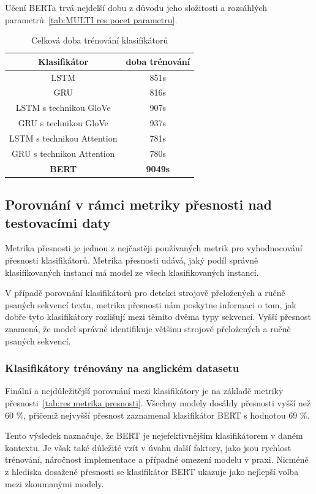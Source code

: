 Učení BERTa trvá nejdelší dobu z důvodu jeho složitosti a rozsáhlých parametrů~\ref{tab:MULTI res pocet parametru}.

\begin{table}[H]
	\centering
	\caption{Celková doba trénování klasifikátorů}\label{tab:MULTI res doba trenovani}
	\begin{tabular}{ c c }
			\toprule
			Klasifikátor & doba trénování\\
			\midrule
			LSTM & 851s\\
			GRU & 816s\\         
			LSTM s technikou GloVe & 907s\\         
			GRU s technikou GloVe  & 937s\\         
			LSTM s technikou Attention & 781s\\         
			GRU s technikou Attention & 780s\\         
			\textbf{BERT} & \textbf{9049s}\\         
			\midrule
		\end{tabular}
\end{table}


\subsection{Porovnání v rámci metriky přesnosti nad testovacími daty}
Metrika přesnosti je jednou z nejčastěji používaných metrik pro vyhodnocování přesnosti klasifikátorů.
Metrika přesnosti udává, jaký podíl správně klasifikovaných instancí má model ze všech klasifikovaných instancí.

V případě porovnání klasifikátorů pro detekci strojově přeložených a ručně psaných sekvencí textu, metrika přesnosti nám poskytne informaci o tom, jak dobře tyto klasifikátory rozlišují mezi těmito dvěma typy sekvencí.
Vyšší přesnost znamená, že model správně identifikuje většinu strojově přeložených a ručně psaných sekvencí.

\subsubsection{Klasifikátory trénovány na anglickém datasetu}
Finální a nejdůležitější porovnání mezi klasifikátory je na základě metriky přesnosti~\ref{tab:res metrika presnosti}.
Všechny modely dosáhly přesnosti vyšší než 60 \%, přičemž nejvyšší přesnost zaznamenal klasifikátor BERT s hodnotou 69 \%.

Tento výsledek naznačuje, že BERT je nejefektivnějším klasifikátorem v daném kontextu.
Je však také důležité vzít v úvahu další faktory, jako jsou rychlost trénování, náročnost implementace a případné omezení modelu v praxi.
Nicméně z hlediska dosažené přesnosti se klasifikátor BERT ukazuje jako nejlepší volba mezi zkoumanými modely.

